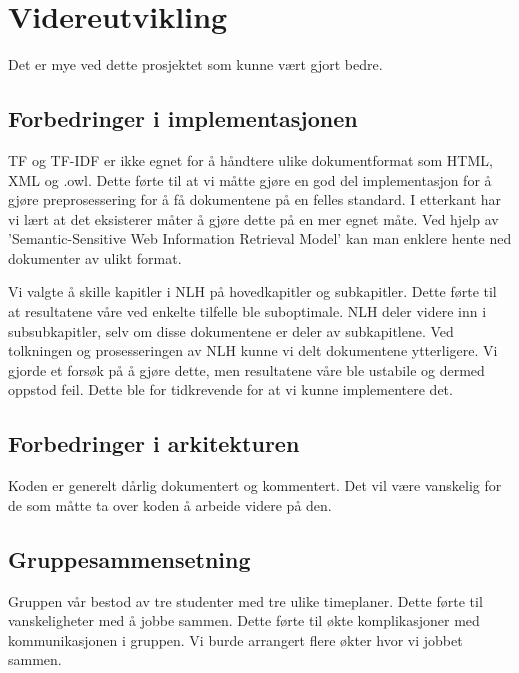 \chapter{Videreutvikling}
\label{improvements}

Det er mye ved dette prosjektet som kunne vært gjort bedre. 

\section{Forbedringer i implementasjonen}
TF og TF-IDF er ikke egnet for å håndtere ulike dokumentformat som HTML, XML og .owl. Dette førte til at vi måtte gjøre en god del implementasjon for å gjøre preprosessering for å få dokumentene på en felles standard. I etterkant har vi lært at det eksisterer måter å gjøre dette på en mer egnet måte. Ved hjelp av 'Semantic-Sensitive Web Information Retrieval Model' kan man enklere hente ned dokumenter av ulikt format. %

Vi valgte å skille kapitler i NLH på hovedkapitler og subkapitler. Dette førte til at resultatene våre ved enkelte tilfelle ble suboptimale. NLH deler videre inn i subsubkapitler, selv om disse dokumentene er deler av subkapitlene. Ved tolkningen og prosesseringen av NLH kunne vi delt dokumentene ytterligere. Vi gjorde et forsøk på å gjøre dette, men resultatene våre ble ustabile og dermed oppstod feil. Dette ble for tidkrevende for at vi kunne implementere det. 

\section{Forbedringer i arkitekturen}
Koden er generelt dårlig dokumentert og kommentert. Det vil være vanskelig for de som måtte ta over koden å arbeide videre på den. 


\section{Gruppesammensetning}
Gruppen vår bestod av tre studenter med tre ulike timeplaner. Dette førte til vanskeligheter med å jobbe sammen. Dette førte til økte komplikasjoner med kommunikasjonen i gruppen. Vi burde arrangert flere økter hvor vi jobbet sammen. 